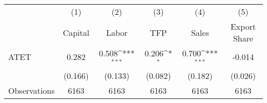 {
\def\sym#1{\ifmmode^{#1}\else\(^{#1}\)\fi}
\begin{tabular}{l*{5}{c}}
\hline\hline
                    &\multicolumn{1}{c}{(1)}&\multicolumn{1}{c}{(2)}&\multicolumn{1}{c}{(3)}&\multicolumn{1}{c}{(4)}&\multicolumn{1}{c}{(5)}\\
                    &\multicolumn{1}{c}{Capital}&\multicolumn{1}{c}{Labor}&\multicolumn{1}{c}{TFP}&\multicolumn{1}{c}{Sales}&\multicolumn{1}{c}{Export Share}\\
\hline
ATET                &       0.282         &       0.508\sym{***}&       0.206\sym{*}  &       0.700\sym{***}&      -0.014         \\
                    &     (0.166)         &     (0.133)         &     (0.082)         &     (0.182)         &     (0.026)         \\
\hline
Observations        &        6163         &        6163         &        6163         &        6163         &        6163         \\
\hline\hline
\end{tabular}
}
